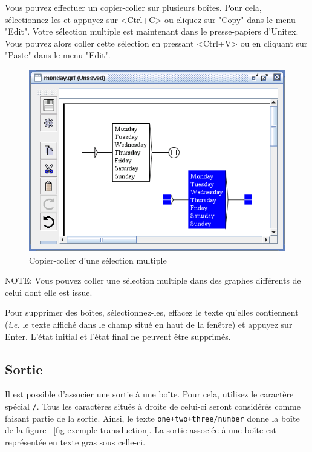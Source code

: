 \bigskip
{}
\noindent Vous pouvez effectuer un copier-coller sur plusieurs boîtes. Pour cela, sélectionnez-les
et appuyez sur <Ctrl+C> ou cliquez sur "Copy" dans le menu "Edit". Votre sélection multiple
est maintenant dans le presse-papiers d’Unitex. Vous pouvez alors coller cette sélection en
pressant <Ctrl+V> ou en cliquant sur "Paste" dans le menu "Edit".


\bigskip
\begin{figure}[!h]
\begin{center}
\includegraphics[width=13cm]{resources/img/fig5-14.png}
\caption{Copier-coller d’une sélection multiple}
\end{center}
\end{figure}

\noindent NOTE: Vous pouvez coller une sélection multiple dans des graphes différents de celui dont
elle est issue.

\bigskip
{}
\noindent Pour supprimer des boîtes, sélectionnez-les, effacez le texte qu'elles contiennent
(\textit{i.e.} le texte affiché dans le champ situé en haut de la fenêtre)
 et appuyez sur Enter. L'état initial et l'état final ne peuvent être supprimés.

\subsection{Sortie}
\index{\verb+/+}
Il est possible d’associer une sortie à une boîte. Pour cela, utilisez le caractère spécial
\verb+/+. Tous les caractères situés à droite de celui-ci seront considérés comme faisant partie de
la sortie. Ainsi, le texte \verb$one+two+three/number$ donne la boîte de la figure
~\ref{fig-exemple-transduction}. La sortie associée à une boîte est représentée en texte gras
sous celle-ci.\\


